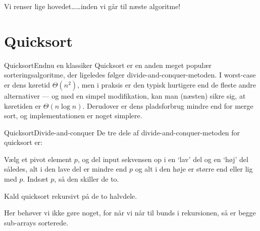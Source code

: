 \documentclass[aspectratio=1610]{beamer}
\begin{document}
\begin{frame}{Vi renser lige hovedet\ldots}{\ldots inden vi går til næste
    algoritme!}
    \centering
\end{frame}


\section{Quicksort}

\begin{frame}{Quicksort}{Endnu en klassiker}
    Quicksort er en anden meget populær sorteringsalgoritme, der ligeledes
    følger divide-and-conquer-metoden. I worst-case er dens køretid
    $\Theta(n^2)$, men i praksis er den typisk hurtigere end de fleste andre
    alternativer --- og med en simpel modifikation, kan man (næsten) sikre sig,
    at køretiden er $\Theta(n \log n)$. Derudover er dens pladsforbrug mindre
    end for merge sort, og implementationen er noget simplere.
\end{frame}


\begin{frame}{Quicksort}{Divide-and-conquer}
    De tre dele af divide-and-conquer-metoden for quicksort er:

    \begin{description}[Combine]
        \pause
        \item[Divide] Vælg et \alert{pivot element} $p$, og del input sekvensen
            op i en `lav' del og en `høj' del således, alt i den lave del er
            mindre end $p$ og alt i den høje er større end eller lig med $p$.
            Indsæt $p$, så den skiller de to.
        \pause
        \item[Conquer] Kald quicksort rekursivt på de to halvdele.
        \pause
        \item[Combine] Her behøver vi ikke gøre noget, for når vi når til bunds
            i rekursionen, så er begge sub-arrays sorterede.
    \end{description}
\end{frame}
\end{document}
